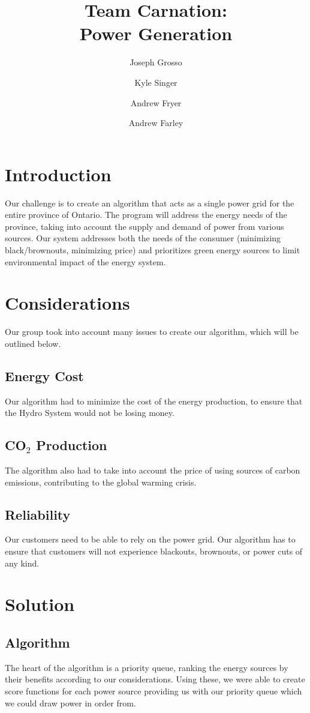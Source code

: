 \documentclass[article]{report} %
\author{Joseph Grosso \and 
	Kyle Singer \and 
	Andrew Fryer \and
	Andrew Farley}
\title{Team Carnation: \\ Power Generation }
\begin{document}
    \maketitle
    \tableofcontents

    \section{Introduction}
    Our challenge is to create an algorithm that acts as a single power grid for the entire province of Ontario. The program will address the energy needs of the province, taking into account the supply and demand of power from various sources. Our system addresses both the needs of the consumer (minimizing black/brownouts, minimizing price) and prioritizes green energy sources to limit environmental impact of the energy system. 

    \section{Considerations}
    Our group took into account many issues to create our algorithm, which will be outlined below.
    \subsection{Energy Cost}
    Our algorithm had to minimize the cost of the energy production, to ensure that the Hydro System would not be losing money. 
    \subsection{CO$_{2}$ Production} 
    The algorithm also had to take into account the price of using sources of carbon emissions, contributing to the global warming crisis.
    \subsection{Reliability}
    Our customers need to be able to rely on the power grid. Our algorithm has to ensure that customers will not experience blackouts, brownouts, or power cuts of any kind. 

    \section{Solution}
    \subsection{Algorithm}
    The heart of the algorithm is a priority queue, ranking the energy sources by their benefits according to our considerations. Using these, we were able to create score functions for each power source providing us with our priority queue which we could draw power in order from. 
    
\end{document}
